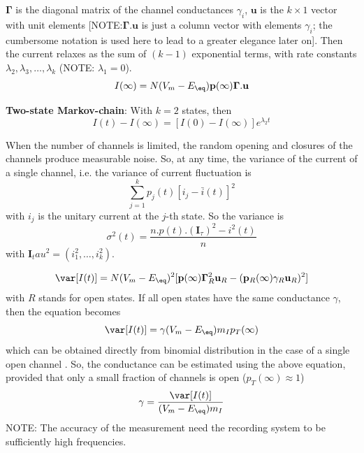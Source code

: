 $\mathbf{\Gamma}$ is the diagonal matrix of the channel conductances $\gamma_i$,
$\mathbf{u}$ is the $k\times 1$ vector with unit elements
[NOTE:$\mathbf{\Gamma.u}$ is just a column vector with elements $\gamma_i$; the
cumbersome  notation is used here to lead to a greater elegance later on].
Then the current relaxes as the sum of $(k-1)$ exponential terms, with rate
constants $\lambda_2, \lambda_3,\ldots,\lambda_k$ (NOTE: $\lambda_1=0$).
\begin{equation}
I(\infty) =
N(V_m-E_\eq)\mathbf{p}(\infty)\mathbf{\Gamma.u}
\end{equation}

{\bf Two-state Markov-chain}: With $k=2$ states, then
\begin{equation}
I(t)-I(\infty) = [I(0)-I(\infty)] e^{\lambda_2 t}
\end{equation}

When the number of channels is limited, the random opening and closures of the
channels produce measurable noise. So, at any time, the variance of the current
of a single channel, i.e. the variance of current fluctuation is
\begin{equation}
\sum\limits_{j=1}^k p_j(t) \left[ i_j - \bar{i}(t) \right]^2
\end{equation}
with $i_j$ is the unitary current at the $j$-th state. So the variance is
\begin{equation}
\sigma^2(t) = \frac{n.p(t).(\mathbf{I}_\tau)^2 - i^2(t)}{n}
\end{equation}
with $\mathbf{I}_tau^2 = (i_1^2, \ldots, i_k^2)$.

\begin{equation}
\var[I(t)] = N(V_m-E_\eq)^2 [ \mathbf{p}(\infty) \mathbf{\Gamma}^2_R
\mathbf{u}_R - (\mathbf{p}_R(\infty)\gamma_R \mathbf{u}_R)^2 ]
\end{equation}
with $R$ stands for open states. If all open states have the same conductance
$\gamma$, then the equation becomes
\begin{equation}
\var[I(t)] = \gamma (V_m-E_\eq)m_I p_T(\infty)
\end{equation}
which can be obtained directly from binomial distribution in the case of a
single open channel \citep{stevens1972}. So, the conductance can be estimated
using the above equation, provided that only a small fraction of channels is
open ($p_T(\infty) \approx 1$)
\begin{equation}
\gamma = \frac{\var[I(t)]}{(V_m-E_\eq)m_I}
\end{equation}
NOTE: The accuracy of the measurement need the recording system to be
sufficiently high frequencies.

